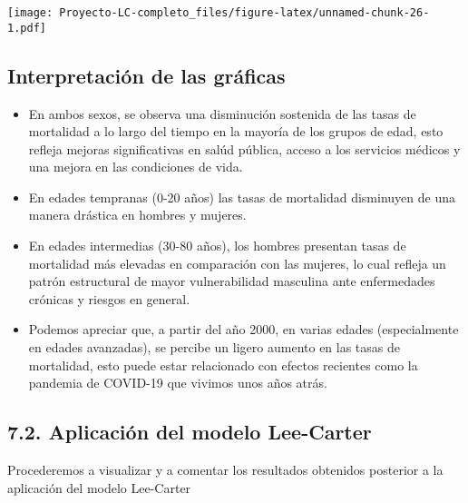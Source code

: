 \documentclass[
]{article}
\begin{document}
\texttt{[image: Proyecto-LC-completo\_files/figure-latex/unnamed-chunk-26-1.pdf]}

\hypertarget{interpretaciuxf3n-de-las-gruxe1ficas}{%
\subsection{Interpretación de las
gráficas}\label{interpretaciuxf3n-de-las-gruxe1ficas}}

\begin{itemize}
\item
  En ambos sexos, se observa una disminución sostenida de las tasas de
  mortalidad a lo largo del tiempo en la mayoría de los grupos de edad,
  esto refleja mejoras significativas en salúd pública, acceso a los
  servicios médicos y una mejora en las condiciones de vida.
\item
  En edades tempranas (0-20 años) las tasas de mortalidad disminuyen de
  una manera drástica en hombres y mujeres.
\item
  En edades intermedias (30-80 años), los hombres presentan tasas de
  mortalidad más elevadas en comparación con las mujeres, lo cual
  refleja un patrón estructural de mayor vulnerabilidad masculina ante
  enfermedades crónicas y riesgos en general.
\item
  Podemos apreciar que, a partir del año 2000, en varias edades
  (especialmente en edades avanzadas), se percibe un ligero aumento en
  las tasas de mortalidad, esto puede estar relacionado con efectos
  recientes como la pandemia de COVID-19 que vivimos unos años atrás.
\end{itemize}

\clearpage

\hypertarget{aplicaciuxf3n-del-modelo-lee-carter}{%
\subsection{7.2. Aplicación del modelo
Lee-Carter}\label{aplicaciuxf3n-del-modelo-lee-carter}}

Procederemos a visualizar y a comentar los resultados obtenidos
posterior a la aplicación del modelo Lee-Carter
\end{document}
